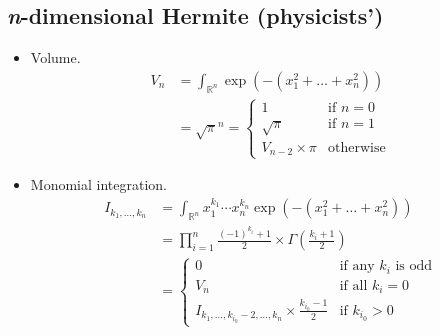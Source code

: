 \documentclass[draft]{scrartcl}
\begin{document}
\subsection*{\textit{n}-dimensional Hermite (physicists')}
\begin{itemize}
  \item Volume.
\begin{align}\nonumber
  V_n
  &= \int_{\mathbb{R}^n} \exp\left(-(x_1^2+\dots+x_n^2)\right)\\
  &= \sqrt{\pi}^n
   = \begin{cases}
     1&\text{if $n=0$}\\
     \sqrt{\pi}&\text{if $n=1$}\\
     V_{n-2} \times \pi&\text{otherwise}
   \end{cases}
\end{align}

  \item Monomial integration.
\begin{align}\nonumber
    I_{k_1,\dots,k_n}
    &= \int_{\mathbb{R}^n} x_1^{k_1}\cdots x_n^{k_n} \exp(-(x_1^2+\dots+x_n^2))\\
    &= \prod_{i=1}^n \frac{(-1)^{k_i} + 1}{2} \times \Gamma\left(\frac{k_i+1}{2}\right)\\
    &=\begin{cases}
      0&\text{if any $k_i$ is odd}\\
      V_n&\text{if all $k_i=0$}\\
      I_{k_1,\dots,k_{i_0}-2,\dots,k_n} \times \frac{k_{i_0} - 1}{2}&\text{if $k_{i_0} > 0$}
    \end{cases}
\end{align}
\end{itemize}
\end{document}

